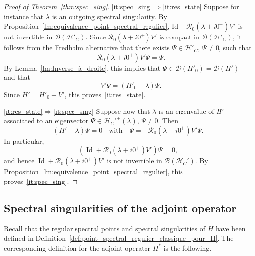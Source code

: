 \documentclass[10pt]{amsart}
\theoremstyle{definition}\newtheorem{defi}[theo]{Definition}\newtheorem{rema}[theo]{Remark}\newtheorem{exam}[theo]{Example}\newtheorem{exem}[theo]{Example}\newtheorem{nota}[theo]{Notation}
\newcommand{\Hi}{\mathcal{H}}
\newcommand{\Res}{\mathcal{R}}
\newcommand{\clB}{\mathcal{B}}
\newcommand{\clD}{\mathcal{D}}
\DeclareMathOperator{\Id}{Id}
\begin{document}
\begin{proof}[Proof of Theorem~\ref{thm:spec_sing}] \eqref{it:spec_sing}$\Rightarrow$\eqref{it:res_state} Suppose for instance that $\lambda$ is an outgoing spectral singularity. By Proposition~\ref{lm:equivalence_point_spectral_regulier}, $\mathrm{Id}+\Res_0(\lambda+i0^+)V'$ is not invertible in $\clB(\Hi'_C)$. Since $\Res_0(\lambda+i0^+)V'$ is compact in $\clB(\Hi'_C)$, it follows from the Fredholm alternative that there exists $\Psi\in\Hi'_C$, $\Psi\neq0$, such that
\begin{equation}\label{eq:preuve_caracterisation_vecteur_propre_singularité_direct_non_inversible}
-\Res_0\left(\lambda+i0^+\right)V'\Psi=\Psi.
\end{equation}
By Lemma~\ref{lm:Inverse_à_droite}, this implies that $\Psi\in\clD(H'_0)=\clD(H')$ and that
\begin{equation}\label{eq:preuve_caracterisation_vecteur_propre_singularité_direct_non_inversible2}
-V'\Psi=(H'_0-\lambda)\Psi.
\end{equation}
Since $H'=H'_0+V'$, this proves~\eqref{it:res_state}.

\eqref{it:res_state}$\Rightarrow$\eqref{it:spec_sing} Suppose now that $\lambda$ is an eigenvalue of $H'$ associated to an eigenvector $\Psi\in\Hi_C'^+(\lambda)$, $\Psi\neq0$. Then
\begin{equation*}\label{eq:preuve_thm_caractérisation_sing_et_vp_ecriture_reciproque_ecriture_vp}
(H'-\lambda)\Psi=0 \quad \text{with}\quad \Psi=-\Res_0\left(\lambda+i0^+\right)V'\Psi.
\end{equation*}
In particular,
\begin{equation*}
(\Id+\Res_0(\lambda+i0^+)V')\Psi=0,
\end{equation*}
and hence $\Id+\Res_0(\lambda+i0^+)V'$ is not invertible in $\clB(\Hi_C')$. By Proposition~\ref{lm:equivalence_point_spectral_regulier}, this proves~\eqref{it:spec_sing}.
\end{proof}


\subsection{Spectral singularities of the adjoint operator}\label{sec:spec_sing_adjoint}

Recall that the regular spectral points and spectral singularities of $H$ have been defined in Definition~\ref{def:point_spectral_regulier_classique_pour_H}. The corresponding definition for the adjoint operator $H^*$ is the following.
\end{document}
